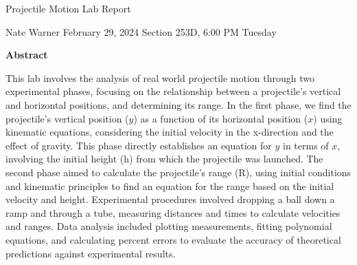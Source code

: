 \documentclass{report}
\title{\Huge{}}
\author{\huge{Nathan Warner}}
\date{\huge{}}
\begin{document}
    \begin{center}
        \begin{Huge}
            Projectile Motion Lab Report
        \end{Huge}
        \begin{Large}
            \bigbreak \noindent 
            Nate Warner
            \smallbreak \noindent
            February 29, 2024
            \bigbreak \noindent 
            Section 253D, 6:00 PM Tuesday 
        \end{Large}
    \end{center}
    \pagebreak 
    \tableofcontents
    \pagebreak \bigbreak \noindent 
    \begin{center}
    \textbf{Abstract}
    \end{center}
    \begin{adjustwidth}{.3in}{.3in}
        \hspace{\parindent}  
        This lab involves the analysis of real world projectile motion through two experimental phases, focusing on the relationship between a projectile's vertical and horizontal positions, and determining its range. In the first phase, we find the projectile's vertical position ($y$) as a function of its horizontal position ($x$) using kinematic equations, considering the initial velocity in the x-direction and the effect of gravity. This phase directly establishes an equation for $y$ in terms of $x$, involving the initial height (h) from which the projectile was launched. The second phase aimed to calculate the projectile's range (R), using initial conditions and kinematic principles to find an equation for the range based on the initial velocity and height. Experimental procedures involved dropping a ball down a ramp and through a tube, measuring distances and times to calculate velocities and ranges. Data analysis included plotting measurements, fitting polynomial equations, and calculating percent errors to evaluate the accuracy of theoretical predictions against experimental results. 
    \end{adjustwidth}
    \bigbreak \noindent 
    \bigbreak \noindent 
\end{document}
